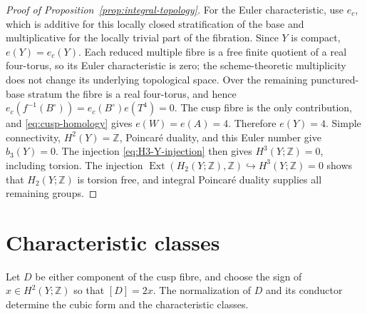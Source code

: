 \documentclass[11pt]{article}
\theoremstyle{definition}
\theoremstyle{remark}
\numberwithin{equation}{section}
\begin{document}
\begin{proof}[Proof of Proposition~\ref{prop:integral-topology}]
For the Euler characteristic, use $e_c$, which is
additive for this locally closed stratification of the base and
multiplicative for the locally trivial part of the fibration.  Since $Y$
is compact, $e(Y)=e_c(Y)$.  Each reduced multiple fibre is a free finite
quotient of a real four-torus, so its Euler characteristic is zero; the
scheme-theoretic multiplicity does not change its underlying topological
space.  Over the remaining punctured-base stratum the fibre is a real
four-torus, and hence
$e_c(f^{-1}(B^\circ))=e_c(B^\circ)e(T^4)=0$.
The cusp fibre is the only contribution, and
\eqref{eq:cusp-homology} gives $e(W)=e(A)=4$.  Therefore $e(Y)=4$.
Simple connectivity, $H^2(Y)=\mathbb Z$, Poincar\'e duality, and this
Euler number give $b_3(Y)=0$.  The injection
\eqref{eq:H3-Y-injection} then gives $H^3(Y;\mathbb Z)=0$, including
torsion.  The injection
$\operatorname{Ext}(H_2(Y;\mathbb Z),\mathbb Z)\hookrightarrow
H^3(Y;\mathbb Z)=0$ shows that $H_2(Y;\mathbb Z)$ is torsion free,
and integral Poincar\'e duality supplies all remaining groups.
\end{proof}


\section{Characteristic classes}
\label{sec:characteristic-classes}

Let $D$ be either component of the cusp fibre, and choose the sign of
$x\in H^2(Y;\mathbb Z)$ so that $[D]=2x$.  The normalization of $D$
and its conductor determine the cubic form and the characteristic classes.
\end{document}
